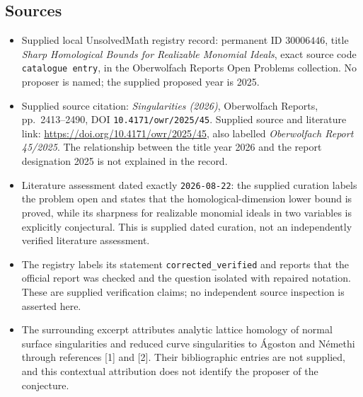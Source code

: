 \documentclass[11pt]{article}
\begin{document}
\subsection{Sources}
\begin{itemize}
\item Supplied local UnsolvedMath registry record: permanent ID \(30006446\), title \emph{Sharp Homological Bounds for Realizable Monomial Ideals}, exact source code \texttt{catalogue entry}, in the Oberwolfach Reports Open Problems collection. No proposer is named; the supplied proposed year is 2025.
\item Supplied source citation: \emph{Singularities (2026)}, Oberwolfach Reports, pp.\ 2413--2490, DOI \texttt{10.4171/owr/2025/45}. Supplied source and literature link: \url{https://doi.org/10.4171/owr/2025/45}, also labelled \emph{Oberwolfach Report 45/2025}. The relationship between the title year 2026 and the report designation 2025 is not explained in the record.
\item Literature assessment dated exactly \texttt{2026-08-22}: the supplied curation labels the problem open and states that the homological-dimension lower bound is proved, while its sharpness for realizable monomial ideals in two variables is explicitly conjectural. This is supplied dated curation, not an independently verified literature assessment.
\item The registry labels its statement \texttt{corrected\_verified} and reports that the official report was checked and the question isolated with repaired notation. These are supplied verification claims; no independent source inspection is asserted here.
\item The surrounding excerpt attributes analytic lattice homology of normal surface singularities and reduced curve singularities to \mbox{\'Agoston} and N\'emethi through references [1] and [2]. Their bibliographic entries are not supplied, and this contextual attribution does not identify the proposer of the conjecture.
\end{itemize}
\end{document}
